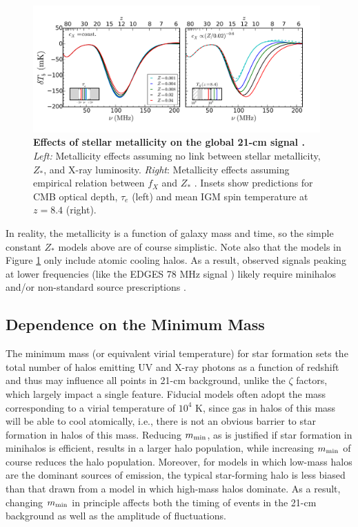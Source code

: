 \begin{figure}[]
\begin{center}
\includegraphics[width=0.98\textwidth]{Mirocha/mirocha2017_fig5.pdf}
\end{center}
\caption{{\bf Effects of stellar metallicity on the global 21-cm signal \cite{Mirocha2017}.} \textit{Left:} Metallicity effects assuming no link between stellar metallicity, $Z_{\ast}$, and X-ray luminosity. \textit{Right}: Metallicity effects assuming empirical relation between $f_X$ and $Z_{\ast}$ \cite{Brorby2016}. Insets show predictions for CMB optical depth, $\tau_e$ (left) and mean IGM spin temperature at $z=8.4$ (right).}
\label{fig:gs_metallicity}
\end{figure}

In reality, the metallicity is a function of galaxy mass and time, so the simple constant $Z_{\ast}$ models above are of course simplistic. Note also that the models in Figure \ref{fig:gs_metallicity} only include atomic cooling halos. As a result, observed signals peaking at lower frequencies (like the EDGES 78 MHz signal \cite{Bowman2018}) likely require minihalos and/or non-standard source prescriptions \cite{Mirocha2018,Mirocha2019}.

\subsection{Dependence on the Minimum Mass}
The minimum mass (or equivalent virial temperature) for star formation sets the total number of halos emitting UV and X-ray photons as a function of redshift and thus may influence all points in 21-cm background, unlike the $\zeta$ factors, which largely impact a single feature. Fiducial models often adopt the mass corresponding to a virial temperature of $10^4$ K, since gas in halos of this mass will be able to cool atomically, i.e., there is not an obvious barrier to star formation in halos of this mass. Reducing $m_{\text{min}}$, as is justified if star formation in minihalos is efficient, results in a larger halo population, while increasing $m_{\text{min}}$ of course reduces the halo population. Moreover, for models in which low-mass halos are the dominant sources of emission, the typical star-forming halo is less biased than that drawn from a model in which high-mass halos dominate. As a result, changing $m_{\text{min}}$ in principle affects both the timing of events in the 21-cm background as well as the amplitude of fluctuations. 

